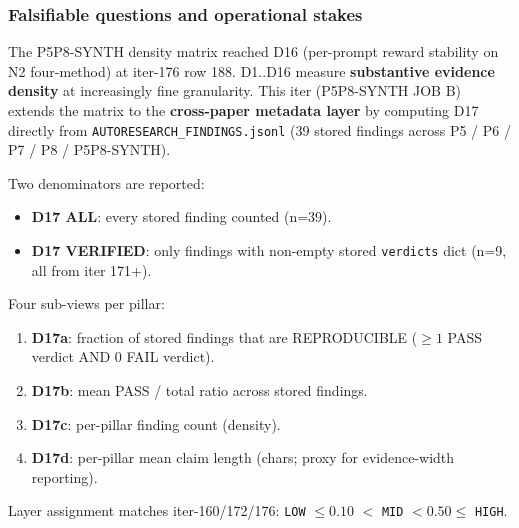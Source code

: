 
\subsubsection{Falsifiable questions and operational stakes}\label{sec:synth-iter180-seventeen-domain}
The P5P8-SYNTH density matrix reached D16 (per-prompt reward
stability on N2 four-method) at iter-176 row 188. D1..D16 measure
\textbf{substantive evidence density} at increasingly fine
granularity. This iter (P5P8-SYNTH JOB B) extends the matrix to the
\textbf{cross-paper metadata layer} by computing D17 directly from
\texttt{AUTORESEARCH\_FINDINGS.jsonl} (39 stored findings across
P5 / P6 / P7 / P8 / P5P8-SYNTH).

Two denominators are reported:
\begin{itemize}
\item \textbf{D17 ALL}: every stored finding counted (n=39).
\item \textbf{D17 VERIFIED}: only findings with non-empty stored
  \texttt{verdicts} dict (n=9, all from iter 171+).
\end{itemize}

Four sub-views per pillar:
\begin{enumerate}
\item \textbf{D17a}: fraction of stored findings that are
  REPRODUCIBLE ($\ge 1$ PASS verdict AND $0$ FAIL verdict).
\item \textbf{D17b}: mean PASS / total ratio across stored findings.
\item \textbf{D17c}: per-pillar finding count (density).
\item \textbf{D17d}: per-pillar mean claim length (chars; proxy
  for evidence-width reporting).
\end{enumerate}

Layer assignment matches iter-160/172/176: \texttt{LOW} $\le 0.10$
$< $ \texttt{MID} $ < 0.50 \le $ \texttt{HIGH}.

